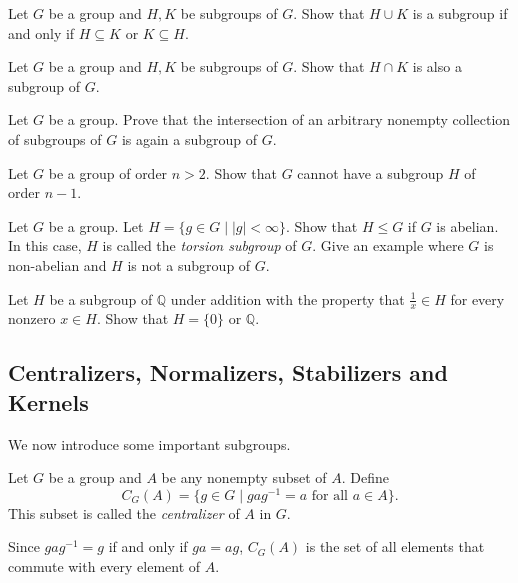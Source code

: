 \begin{exercise}
    Let $G$ be a group and $H,K$ be subgroups of $G$. Show that $H\cup K$ is a subgroup if and only if $H\subseteq K$ or $K\subseteq H$.
\end{exercise}

\begin{exercise}
    Let $G$ be a group and $H,K$ be subgroups of $G$. Show that $H\cap K$ is also a subgroup of $G$.
\end{exercise}

\begin{exercise}
\label{subgrIntersubgr}
    Let $G$ be a group. Prove that the intersection of an arbitrary nonempty collection of subgroups of $G$ is again a subgroup of $G$.
\end{exercise}

\begin{exercise}
    Let $G$ be a group of order $n>2$. Show that $G$ cannot have a subgroup $H$ of order $n-1$.
\end{exercise}

\begin{exercise}
    Let $G$ be a group. Let $H=\{g\in G\mid |g|<\infty\}$. Show that $H\leq G$ if $G$ is abelian. In this case, $H$ is called the \textit{torsion subgroup} of $G$. Give an example where $G$ is non-abelian and $H$ is not a subgroup of $G$.
\end{exercise}

\begin{exercise}
    Let $H$ be a subgroup of $\mathbb{Q}$ under addition with the property that $\frac 1x\in H$ for every nonzero $x\in H$. Show that $H=\{0\}$ or $\mathbb{Q}$.
\end{exercise}

\subsection{Centralizers, Normalizers, Stabilizers and Kernels}

We now introduce some important subgroups.

\begin{definition}
    Let $G$ be a group and $A$ be any nonempty subset of $A$. Define
    $$C_G(A)=\{g\in G\mid gag^{-1}=a\text{ for all }a\in A\}.$$
    This subset is called the \textit{centralizer} of $A$ in $G$.
\end{definition}

Since $gag^{-1}=g$ if and only if $ga=ag$, $C_G(A)$ is the set of all elements that commute with every element of $A$.

